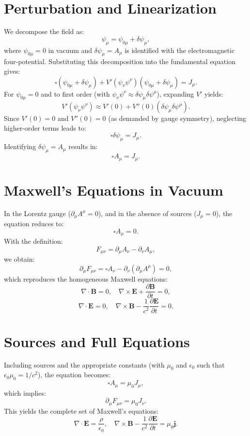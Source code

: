 \documentclass{article}
\begin{document}
	\section{Perturbation and Linearization}
	We decompose the field as:
	\[
	\psi_\mu = \psi_{0\mu} + \delta \psi_\mu,
	\]
	where \(\psi_{0\mu} = 0\) in vacuum and \(\delta \psi_\mu = A_\mu\) is identified with the electromagnetic four-potential. Substituting this decomposition into the fundamental equation gives:
	\[
	\square (\psi_{0\mu} + \delta \psi_\mu) + V'(\psi_\nu \psi^\nu) (\psi_{0\mu} + \delta \psi_\mu) = J_\mu.
	\]
	For \(\psi_{0\mu} = 0\) and to first order (with \(\psi_\nu \psi^\nu \approx \delta \psi_\mu \delta \psi^\mu\)), expanding \(V'\) yields:
	\[
	V'(\psi_\nu \psi^\nu) \approx V'(0) + V''(0) (\delta \psi_\mu \delta \psi^\mu).
	\]
	Since \(V'(0) = 0\) and \(V''(0) = 0\) (as demanded by gauge symmetry), neglecting higher-order terms leads to:
	\[
	\square \delta \psi_\mu = J_\mu.
	\]
	Identifying \(\delta \psi_\mu = A_\mu\) results in:
	\[
	\square A_\mu = J_\mu.
	\]
	
	\section{Maxwell’s Equations in Vacuum}
	In the Lorentz gauge (\(\partial_\mu A^\mu = 0\)), and in the absence of sources (\(J_\mu = 0\)), the equation reduces to:
	\[
	\square A_\mu = 0.
	\]
	With the definition:
	\[
	F_{\mu\nu} = \partial_\mu A_\nu - \partial_\nu A_\mu,
	\]
	we obtain:
	\[
	\partial_\mu F_{\mu\nu} = \square A_\nu - \partial_\nu (\partial_\mu A^\mu) = 0,
	\]
	which reproduces the homogeneous Maxwell equations:
	\[
	\nabla \cdot \mathbf{B} = 0, \quad \nabla \times \mathbf{E} + \frac{\partial \mathbf{B}}{\partial t} = 0,
	\]
	\[
	\nabla \cdot \mathbf{E} = 0, \quad \nabla \times \mathbf{B} - \frac{1}{c^2} \frac{\partial \mathbf{E}}{\partial t} = 0.
	\]
	
	\section{Sources and Full Equations}
	Including sources and the appropriate constants (with \(\mu_0\) and \(\epsilon_0\) such that \(\epsilon_0 \mu_0 = 1/c^2\)), the equation becomes:
	\[
	\square A_\mu = \mu_0 J_\mu,
	\]
	which implies:
	\[
	\partial_\mu F_{\mu\nu} = \mu_0 J_\nu.
	\]
	This yields the complete set of Maxwell's equations:
	\[
	\nabla \cdot \mathbf{E} = \frac{\rho}{\epsilon_0}, \quad \nabla \times \mathbf{B} - \frac{1}{c^2} \frac{\partial \mathbf{E}}{\partial t} = \mu_0 \mathbf{j}.
	\]
	
\end{document}
